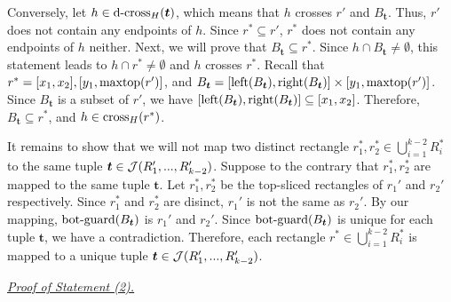 \vgap 

Conversely, let $h\in \mathrm{d\text{-}cross}_H(\textrm{\boldmath${t}$})$, which means that $h$ crosses $r'$ and $B_{\bm{t}}$. Thus, $r'$ does not contain any endpoints of $h$. Since $r^*\subseteq r'$, $r^*$ does not contain any endpoints of $h$ neither. 
Next, we will prove that $B_{\bm{t}} \subseteq r^*$. Since $h \cap B_{\bm{t}}\neq \emptyset$, this statement leads to $h \cap r^* \neq \emptyset$ and $h$ crosses $r^*$. Recall that $r^* = [x_1,x_2], [y_1, \mathrm{maxtop}(r')]$, and $B_{\textrm{\boldmath${t}$}} = [\mathrm{left}(B_{\textrm{\boldmath${t}$}}), \mathrm{right}(B_{\textrm{\boldmath${t}$}})]\times [y_1,\mathrm{maxtop}(r')]$. Since $B_{\bm{t}}$ is a subset of $r'$, we have $[\mathrm{left}(B_{\textrm{\boldmath${t}$}}), \mathrm{right}(B_{\textrm{\boldmath${t}$}})] \subseteq [x_1,x_2]$. Therefore, $B_{\bm{t}} \subseteq r^*$, and $h\in \mathrm{cross}_H(r^*)$. 

\vgap 

It remains to show that we will not map two distinct rectangle $r_1^*, r_2^*\in \bigcup_{i = 1}^{k-2}R_i^*$ to the same tuple $\textrm{\boldmath${t}$}\in \mathcal{J}(R_1',...,R_{k-2}')$. Suppose to the contrary that $r_1^*, r_2^*$ are mapped to the same tuple $\bm{t}$. Let $r_1^*, r_2^*$ be the top-sliced rectangles of $r_1'$ and $r_2'$ respectively. Since $r_1^*$ and $r_2^*$ are disinct, $r_1'$ is not the same as $r_2'$. By our mapping, $\mathrm{bot\text{-}guard}(B_{\textrm{\boldmath${t}$}})$ is $r_1'$ and $r_2'$. Since $\mathrm{bot\text{-}guard}(B_{\textrm{\boldmath${t}$}})$ is unique for each tuple $\bm{t}$, we have a contradiction. Therefore, each rectangle $r^*\in \bigcup_{i = 1}^{k-2}R_i^*$ is mapped to a unique tuple $\textrm{\boldmath${t}$}\in \mathcal{J}(R_1',...,R_{k-2}')$.

\noindent \underline{\em Proof of Statement (2).} 
